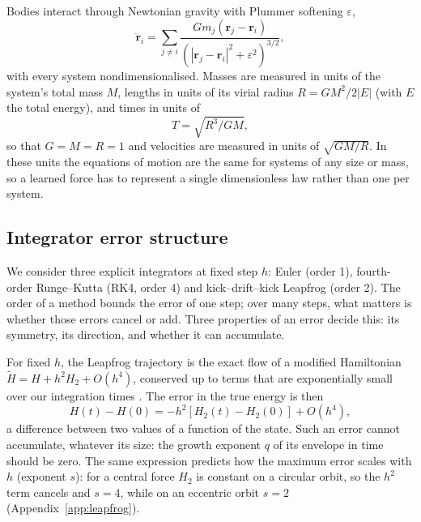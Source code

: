 \documentclass[a4paper,journal]{IEEEtran}
\newcommand{\vect}[1]{\mathbf{#1}}
\begin{document}
Bodies interact through Newtonian gravity with Plummer softening $\varepsilon$,
\begin{equation}
\ddot{\vect r}_i=\sum_{j\neq i}\frac{G m_j(\vect r_j-\vect r_i)}{\left(|\vect r_j-\vect r_i|^2+\varepsilon^2\right)^{3/2}} ,
\label{eq:force}
\end{equation}
with every system nondimensionalised. Masses are measured in units of the system's total mass $M$, lengths in units of its virial radius $R=GM^2/2|E|$ (with $E$ the total energy), and times in units of
\begin{equation}
T=\sqrt{R^3/GM},
\end{equation}
so that $G=M=R=1$ and velocities are measured in units of $\sqrt{GM/R}$. In these units the equations of motion are the same for systems of any size or mass, so a learned force has to represent a single dimensionless law rather than one per system.

\subsection{Integrator error structure}\label{sec:thint}

We consider three explicit integrators at fixed step $h$: Euler (order 1), fourth-order Runge--Kutta (RK4, order 4) and kick--drift--kick Leapfrog (order 2). The order of a method bounds the error of one step; over many steps, what matters is whether those errors cancel or add. Three properties of an error decide this: its symmetry, its direction, and whether it can accumulate.

For fixed $h$, the Leapfrog trajectory is the exact flow of a modified Hamiltonian $\tilde H=H+h^2H_2+O(h^4)$, conserved up to terms that are exponentially small over our integration times \cite{Hairer2006}. The error in the true energy is then
\begin{equation}
H(t)-H(0)=-h^2\left[H_2(t)-H_2(0)\right]+O(h^4),
\label{eq:modham}
\end{equation}
a difference between two values of a function of the state. Such an error cannot accumulate, whatever its size: the growth exponent $q$ of its envelope in time should be zero. The same expression predicts how the maximum error scales with $h$ (exponent $s$): for a central force $H_2$ is constant on a circular orbit, so the $h^2$ term cancels and $s=4$, while on an eccentric orbit $s=2$ (Appendix~\ref{app:leapfrog}).
\end{document}
